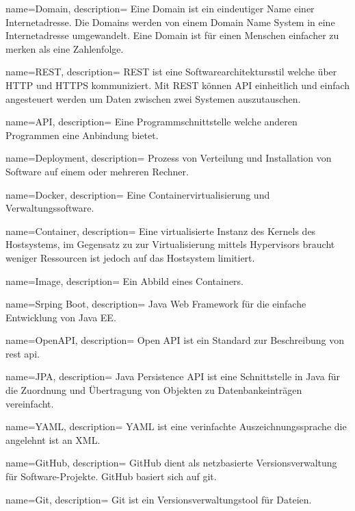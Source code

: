 {
	name=Domain,
	description={
		Eine Domain ist ein eindeutiger Name einer Internetadresse. Die Domains werden von einem Domain Name System in eine Internetadresse umgewandelt. Eine Domain ist für einen Menschen einfacher zu merken als eine Zahlenfolge.
	}
}

{
	name=REST,
	description={
		REST ist eine Softwarearchitektursstil welche über HTTP und HTTPS kommuniziert. Mit REST können API einheitlich und einfach angesteuert werden um Daten zwischen zwei Systemen auszutauschen.
	}
}

{
	name=API,
	description={
		Eine Programmschnittstelle welche anderen Programmen eine Anbindung bietet.
	}
}

{
	name=Deployment,
	description={
		Prozess von Verteilung und Installation von Software auf einem oder mehreren Rechner.
	}
}

{
	name=Docker,
	description={
		Eine Containervirtualisierung und Verwaltungssoftware.
	}
}

{
	name=Container,
	description={
		Eine virtualisierte Instanz des Kernels des Hostsystems, im Gegensatz zu zur Virtualisierung mittels Hypervisors braucht weniger Ressourcen ist jedoch auf das Hostsystem limitiert.
	}
}

{
	name=Image,
	description={
		Ein Abbild eines Containers.
	}
}

{
	name=Srping Boot,
	description={
		Java Web Framework für die einfache Entwicklung von Java EE.
	}
}

{
	name=OpenAPI,
	description={
		Open API ist ein Standard zur Beschreibung von \gls{rest} \gls{api}.
	}
}

{
	name=JPA,
	description={
		Java Persistence API ist eine Schnittstelle in Java für die Zuordnung und Übertragung von Objekten zu Datenbankeinträgen vereinfacht.
	}
}

{
	name=YAML,
	description={
		YAML ist eine verinfachte Auszeichnungssprache die angelehnt ist an XML.
	}
}

{
	name=GitHub,
	description={
		GitHub dient als netzbasierte Versionsverwaltung für Software-Projekte. GitHub basiert sich auf \gls{git}.
	}
}

{
	name=Git,
	description={
		Git ist ein Versionsverwaltungstool für Dateien.
	}
}

